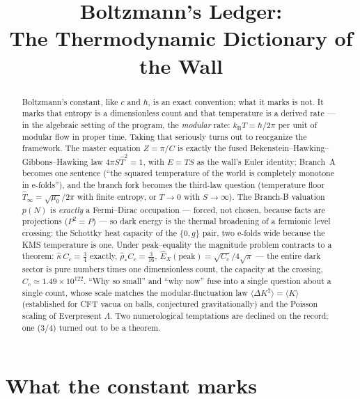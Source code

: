 \documentclass[11pt,reqno]{amsart}
\title[Boltzmann's ledger]{Boltzmann's Ledger:\\ The Thermodynamic Dictionary of the Wall}
\author{\AuthorName}
\date{\PreprintDate}
\numberwithin{equation}{section}
\theoremstyle{definition}
\theoremstyle{remark}
\newcommand{\kB}{k_{\mathrm B}}
\begin{document}
\begin{abstract}
Boltzmann's constant, like $c$ and $\hbar$, is an exact convention; what it
marks is not. It marks that entropy is a dimensionless count and that
temperature is a derived rate --- in the algebraic setting of the program,
the \emph{modular} rate: $\kB T=\hbar/2\pi$ per unit of modular flow in
proper time. Taking that seriously turns out to reorganize the framework.
The master equation $Z=\pi/C$ is exactly the fused
Bekenstein--Hawking--Gibbons--Hawking law $4\pi S\hat T^2=1$, with
$E=TS$ as the wall's Euler identity; Branch~A becomes one sentence
(``the squared temperature of the world is completely monotone in
e-folds''), and the branch fork becomes the third-law question
(temperature floor $\hat T_\infty=\sqrt{\mu_0}/2\pi$ with finite entropy,
or $T\to0$ with $S\to\infty$). The Branch-B valuation $p(N)$ is
\emph{exactly} a Fermi--Dirac occupation --- forced, not chosen, because
facts are projections ($P^2=P$) --- so dark energy is the thermal
broadening of a fermionic level crossing: the Schottky heat capacity of
the $\{0,g\}$ pair, two e-folds wide because the KMS temperature is one.
Under peak--equality the magnitude problem contracts to a theorem:
$\hat\kappa\,C_c=\tfrac34$ exactly, $\hat\rho_*C_c=\tfrac{3}{16}$,
$\hat E_X(\mathrm{peak})=\sqrt{C_c}/4\sqrt\pi$ --- the entire dark sector
is pure numbers times one dimensionless count, the capacity at the
crossing, $C_c\simeq1.49\times10^{122}$. ``Why so small'' and ``why now''
fuse into a single question about a single count, whose scale matches the
modular-fluctuation law $\langle\Delta K^2\rangle=\langle K\rangle$
(established for CFT vacua on balls, conjectured gravitationally) and the
Poisson scaling of Everpresent $\Lambda$. Two numerological temptations
are declined on the record; one ($3/4$) turned out to be a theorem.
\end{abstract}

\maketitle
\tableofcontents

\section{What the constant marks}\label{sec:marks}
\end{document}
